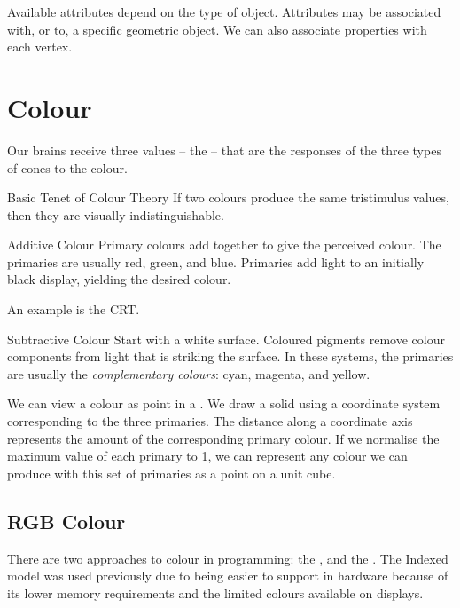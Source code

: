 \documentclass[../notes.tex]{subfiles}
\begin{document}
        Available attributes depend on the type of object.
        Attributes may be associated with, or  to, a specific geometric object.
        We can also associate properties with each vertex.

    \section{Colour}
      Our brains receive three values -- the  --
      that are the responses of the three types of cones to the colour.

      \begin{definition}{Basic Tenet of Colour Theory}
        If two colours produce the same tristimulus values,
        then they are visually indistinguishable.
      \end{definition}

      \begin{definition}{Additive Colour}
        Primary colours add together to give the perceived colour.
        The primaries are usually red, green, and blue.
        Primaries add light to an initially black display, yielding the desired colour.

        An example is the CRT.
      \end{definition}

      \begin{definition}{Subtractive Colour}
        Start with a white surface.
        Coloured pigments remove colour components from light that is striking the surface.
        In these systems, the primaries are usually the \emph{complementary colours}:
        cyan, magenta, and yellow.
      \end{definition}

      We can view a colour as point in a .
      We draw a solid using a coordinate system corresponding to the three primaries.
      The distance along a coordinate axis represents the amount of the corresponding
      primary colour.
      If we normalise the maximum value of each primary to 1,
      we can represent any colour we can produce with this set of primaries as a point
      on a unit cube.

      \subsection{RGB Colour}
        There are two approaches to colour in programming: the ,
        and the .
        The Indexed model was used previously due to being easier to support in hardware
        because of its lower memory requirements and the limited colours available on displays.
\end{document}
